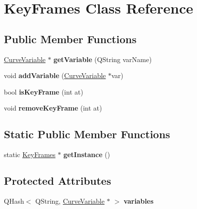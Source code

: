 \hypertarget{class_key_frames}{
\section{\-Key\-Frames \-Class \-Reference}
\label{class_key_frames}
}
\subsection*{\-Public \-Member \-Functions}
\begin{DoxyCompactItemize}
\item 
\hypertarget{class_key_frames_a8cb189f56031f4ce23909a0ca10dea61}{
\hyperlink{class_curve_variable}{\-Curve\-Variable} $\ast$ {\bfseries get\-Variable} (\-Q\-String var\-Name)}
\label{class_key_frames_a8cb189f56031f4ce23909a0ca10dea61}

\item 
\hypertarget{class_key_frames_a2b131a5c9ce3419d31d8f14aa1e76315}{
void {\bfseries add\-Variable} (\hyperlink{class_curve_variable}{\-Curve\-Variable} $\ast$var)}
\label{class_key_frames_a2b131a5c9ce3419d31d8f14aa1e76315}

\item 
\hypertarget{class_key_frames_ae373e7db9a864a03030ac5cfebc7ac0f}{
bool {\bfseries is\-Key\-Frame} (int at)}
\label{class_key_frames_ae373e7db9a864a03030ac5cfebc7ac0f}

\item 
\hypertarget{class_key_frames_abb7bb188bf306a4e8efd0ac4b888432f}{
void {\bfseries remove\-Key\-Frame} (int at)}
\label{class_key_frames_abb7bb188bf306a4e8efd0ac4b888432f}

\end{DoxyCompactItemize}
\subsection*{\-Static \-Public \-Member \-Functions}
\begin{DoxyCompactItemize}
\item 
\hypertarget{class_key_frames_a6db9235a211a7cd467f98984c29b3174}{
static \hyperlink{class_key_frames}{\-Key\-Frames} $\ast$ {\bfseries get\-Instance} ()}
\label{class_key_frames_a6db9235a211a7cd467f98984c29b3174}

\end{DoxyCompactItemize}
\subsection*{\-Protected \-Attributes}
\begin{DoxyCompactItemize}
\item 
\hypertarget{class_key_frames_a4d83641d0bef3fbb30689d6627559336}{
\-Q\-Hash$<$ \-Q\-String, \hyperlink{class_curve_variable}{\-Curve\-Variable} $\ast$ $>$ {\bfseries variables}}
\label{class_key_frames_a4d83641d0bef3fbb30689d6627559336}

\end{DoxyCompactItemize}
